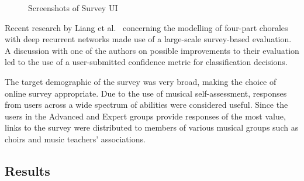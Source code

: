 \documentclass[12pt,a4paper,twoside,openright]{report}
\begin{document}
\begin{figure}[H]
\centering
{}


\caption{Screenshots of Survey UI}
\label{fig:survey-ui}
\end{figure}

Recent research by Liang et al.\ \cite{liangbachbot} concerning the modelling of
four-part chorales with deep recurrent networks made use of a large-scale
survey-based evaluation. A discussion with one of the authors on possible
improvements to their evaluation led to the use of a user-submitted confidence
metric for classification decisions.

The target demographic of the survey was very broad, making the choice of online
survey appropriate. Due to the use of musical self-assessment, responses from
users across a wide spectrum of abilities were considered useful. Since the
users in the Advanced and Expert groups provide responses of the most value,
links to the survey were distributed to members of various musical groups such
as choirs and music teachers' associations. 

\subsection{Results}
\end{document}
